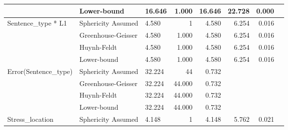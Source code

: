 \documentclass[a4paper]{article}
\begin{document}
\begin{table}[H]
\begin{center}
\begin{tabular}{p{}p{}|l|r|r|r|r|r|}
\cline{2-7}
                                                        & Lower-bound        & 16.646                            & 1.000                   & 16.646                           & 22.728                 & 0.000                      \\ 
\hline
\multirow{4}{*}{Sentence\_type * L1}                    & Sphericity Assumed & 4.580                             & 1                       & 4.580                            & 6.254                  & 0.016                      \\ 
\cline{2-7}
                                                        & Greenhouse-Geisser & 4.580                             & 1.000                   & 4.580                            & 6.254                  & 0.016                      \\ 
\cline{2-7}
                                                        & Huynh-Feldt        & 4.580                             & 1.000                   & 4.580                            & 6.254                  & 0.016                      \\ 
\cline{2-7}
                                                        & Lower-bound        & 4.580                             & 1.000                   & 4.580                            & 6.254                  & 0.016                      \\ 
\hline
\multirow{4}{*}{Error(Sentence\_type)}                  & Sphericity Assumed & 32.224                            & 44                      & 0.732                            & \multicolumn{1}{l|}{~} & \multicolumn{1}{l|}{~}     \\ 
\cline{2-7}
                                                        & Greenhouse-Geisser & 32.224                            & 44.000                  & 0.732                            & \multicolumn{1}{l|}{~} & \multicolumn{1}{l|}{~}     \\ 
\cline{2-7}
                                                        & Huynh-Feldt        & 32.224                            & 44.000                  & 0.732                            & \multicolumn{1}{l|}{~} & \multicolumn{1}{l|}{~}     \\ 
\cline{2-7}
                                                        & Lower-bound        & 32.224                            & 44.000                  & 0.732                            & \multicolumn{1}{l|}{~} & \multicolumn{1}{l|}{~}     \\ 
\hline
\multirow{4}{*}{Stress\_location}                       & Sphericity Assumed & 4.148                             & 1                       & 4.148                            & 5.762                  & 0.021                      \\ 

\end{tabular}
\end{center}
\end{table}
\end{document}

